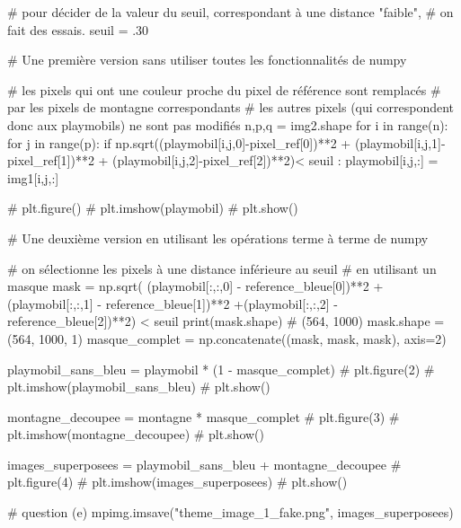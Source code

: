 \documentclass[10pt,fleqn]{article} %
\begin{document}
\begin{multicols}{2}
\begin{corrige}
\begin{python}
# pour décider de la valeur du seuil, correspondant à une distance "faible",
# on fait des essais. 
seuil = .30

# Une première version sans utiliser toutes les fonctionnalités de numpy

# les pixels qui ont une couleur proche du pixel de référence sont remplacés
# par les pixels de montagne correspondants
# les autres pixels (qui correspondent donc aux playmobils) ne sont pas modifiés
n,p,q = img2.shape
for i in range(n):
    for j in range(p):
        if np.sqrt((playmobil[i,j,0]-pixel_ref[0])**2 + (playmobil[i,j,1]-pixel_ref[1])**2
                   + (playmobil[i,j,2]-pixel_ref[2])**2)< seuil :
            playmobil[i,j,:] = img1[i,j,:]

# plt.figure()
# plt.imshow(playmobil)
# plt.show()

# Une deuxième version en utilisant les opérations terme à terme de numpy

# on sélectionne les pixels à une distance inférieure au seuil
# en utilisant un masque
mask = np.sqrt( (playmobil[:,:,0] - reference_bleue[0])**2
               +(playmobil[:,:,1] - reference_bleue[1])**2
               +(playmobil[:,:,2] - reference_bleue[2])**2) < seuil
print(mask.shape)
# (564, 1000)
mask.shape = (564, 1000, 1)
masque_complet = np.concatenate((mask, mask, mask), axis=2)

playmobil_sans_bleu = playmobil * (1 - masque_complet)
# plt.figure(2)
# plt.imshow(playmobil_sans_bleu)
# plt.show()

montagne_decoupee = montagne * masque_complet
# plt.figure(3)
# plt.imshow(montagne_decoupee)
# plt.show()

images_superposees = playmobil_sans_bleu + montagne_decoupee
# plt.figure(4)
# plt.imshow(images_superposees)
# plt.show()

# question (e)
mpimg.imsave("theme_image_1_fake.png", images_superposees)
\end{python}
\end{corrige}
\else
\fi


\ifprof
\else
\end{multicols}
\fi
\end{document}
